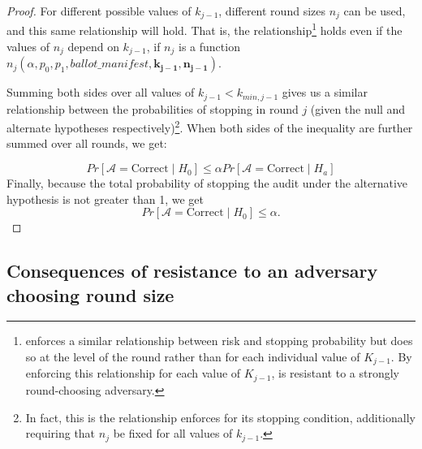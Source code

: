 \begin{proof}
For different possible values of $k_{j-1}$, different round sizes $n_j$ can be used, and this same relationship will hold. 
That is, the relationship\footnote{\Minerva enforces a similar relationship between risk and stopping probability but does so at the level of the round rather than for each individual value of $K_{j-1}$. By enforcing this relationship for each value of $K_{j-1}$, \Providence is resistant to a strongly round-choosing adversary.} holds even if the values of $n_{j}$ depend on $k_{j-1}$, if $n_j$ is a function $n_j(\alpha, p_0, p_1, ballot\_manifest, \bm{k_{j-1}}, \bm{n_{j-1}})$.

Summing both sides over all values of $k_{j-1} < k_{min, j-1}$ gives us a similar relationship between the probabilities of stopping in round $j$ (given the null and alternate hypotheses respectively)\footnote{In fact, this is the relationship \Minerva enforces for its stopping condition, additionally requiring that $n_j$ be fixed for all values of $k_{j-1}$.}. 
When both sides of the inequality are further summed over all rounds, we get:  

$$
Pr[\mathcal{A}=\text{Correct} \mid H_0]
\le
\alpha Pr[\mathcal{A}=\text{Correct} \mid H_a]
$$
Finally, because the total probability of stopping the audit under
the alternative hypothesis is not greater than 1, we get
$$
Pr[\mathcal{A}=\text{Correct} \mid H_0] \le
\alpha.
$$
\end{proof}

\subsection{Consequences of resistance to an adversary choosing round size}
\label{sec:adversary}

